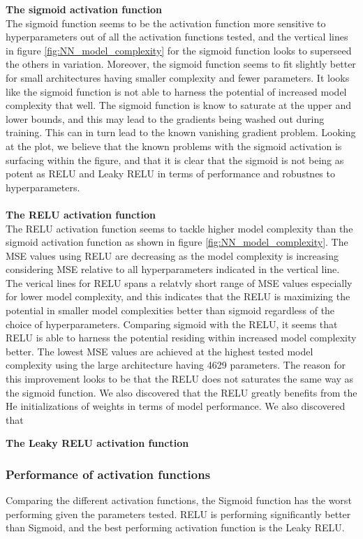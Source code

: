 \documentclass
[twocolumn,
secnumarabic,
nobibnotes,
aps,
prl,
reprint,
groupedaddress,
amsmath,
amssymb
]{revtex4-2}
\begin{document}
\textbf{The sigmoid activation function}\\
The sigmoid function seems to be the activation function more sensitive to hyperparameters out of all the activation functions tested, and the vertical lines in figure \ref{fig:NN_model_complexity} for the sigmoid function looks to superseed the others in variation. Moreover, the sigmoid function seems to fit slightly better for small architectures having smaller complexity and fewer parameters. It looks like the sigmoid function is not able to harness the potential of increased model complexity that well. The sigmoid function is know to saturate at the upper and lower bounds, and this may lead to the gradients being washed out during training. This can in turn lead to the known vanishing gradient problem. Looking at the plot, we believe that the known problems with the sigmoid activation is surfacing within the figure, and that it is clear that the sigmoid is not being as potent as RELU and Leaky RELU in terms of performance and robustnes to hyperparameters.\\\\

\textbf{The RELU activation function}\\
The RELU activation function seems to tackle higher model complexity than the sigmoid activation function as shown in figure \ref{fig:NN_model_complexity}. The MSE values using RELU are decreasing as the model complexity is increasing considering MSE relative to all hyperparameters indicated in the vertical line. The verical lines for RELU spans a relatvly short range of MSE values especially for lower model complexity, and this indicates that the RELU is maximizing the potential in smaller model complexities better than sigmoid regardless of the choice of hyperparameters. Comparing sigmoid with the RELU, it seems that RELU is able to harness the potential residing within increased model complexity better. The lowest MSE values are achieved at the highest tested model complexity using the large architecture having 4629 parameters. The reason for this improvement looks to be that the RELU does not saturates the same way as the sigmoid function. We also discovered that the RELU greatly benefits from the He initializations of weights \cite{He2015} in terms of model performance. We also discovered that


\textbf{The Leaky RELU activation function}\\



\subsubsection{Performance of activation functions}
Comparing the different activation functions, the Sigmoid function has the worst performing given the parameters tested. RELU is performing significantly better than Sigmoid, and the best performing activation function is the Leaky RELU.
\end{document}
